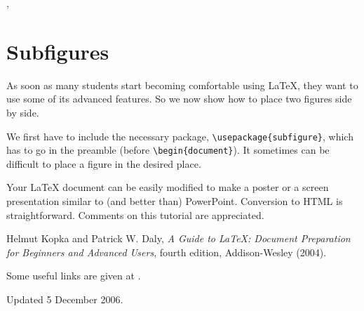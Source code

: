 \documentclass[12pt]{article}
\begin{document}
   {\color{blue}{We can change colors for emphasis}},
   {\color{green}{but}} {\color{cyan}{who is going pay for the ink?}}

   \section{\label{morefig}Subfigures}

   As soon as many students start becoming comfortable using \LaTeX, they want
   to use some of its advanced features. So we now show how to place two
   figures side by side.

   
   We first have to include the necessary package,
   \verb+\usepackage{subfigure}+, which has to go in the preamble (before
   \verb+\begin{document}+). It sometimes can be difficult to place a figure in
   the desired place.

   Your LaTeX document can be easily modified to make a poster or a screen
   presentation similar to (and better than) PowerPoint. Conversion to HTML is
   straightforward. Comments on this tutorial are appreciated.

   \begin{thebibliography}{5}

	   Helmut Kopka and Patrick W. Daly, \textsl{A Guide to
	   \LaTeX: Document Preparation for Beginners and Advanced Users},
	   fourth edition, Addison-Wesley (2004).

	   Some useful links are
	   given at \url{}.

	   \end{thebibliography}

	   {\small \noindent Updated 5 December 2006.}
	   
\end{document}
